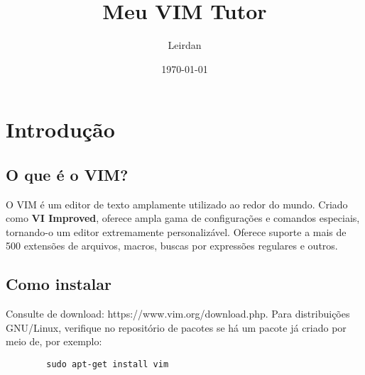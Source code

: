 \documentclass[12pt]{article}
\title{Meu VIM Tutor}
\author{Leirdan}
\date{\today}
\begin{document}
\maketitle

\section{Introdução}
	\subsection{O que é o VIM?}
	O VIM é um editor de texto amplamente utilizado ao redor do mundo. Criado como \textbf{VI Improved}, oferece ampla gama de configurações e comandos especiais, tornando-o um editor extremamente personalizável. Oferece suporte a mais de 500 extensões de arquivos, macros, buscas por expressões regulares e outros. 
	\subsection{Como instalar}
	Consulte de download: https://www.vim.org/download.php. Para distribuições GNU/Linux, verifique no repositório de pacotes se há um pacote já criado por meio de, por exemplo:
	\begin{lstlisting}
		sudo apt-get install vim
	\end{lstlisting}
\end{document}
